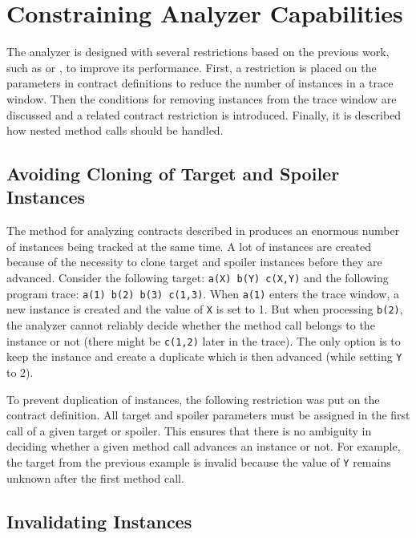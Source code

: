 \section{Constraining Analyzer Capabilities}
\label{constraining}

The analyzer is designed with several restrictions based on the previous work,
such as \cite{janousek} or \cite{FITPUB10817}, to improve its performance.
First, a restriction is placed on the parameters in contract definitions to
reduce the number of instances in a trace window. Then the conditions for
removing instances from the trace window are discussed and a related contract
restriction is introduced. Finally, it is described how nested method calls
should be handled.

\subsection{Avoiding Cloning of Target and Spoiler Instances}

The method for analyzing contracts described in \cite{janousek} produces an
enormous number of instances being tracked at the same time. A lot of instances
are created because of the necessity to clone target and spoiler instances
before they are advanced. Consider the following target: \texttt{a(X) b(Y)
c(X,Y)} and the following program trace: \texttt{a(1) b(2) b(3) c(1,3)}.  When
\texttt{a(1)} enters the trace window, a new instance is created and the value
of \texttt{X} is set to 1. But when processing \texttt{b(2)}, the analyzer
cannot reliably decide whether the method call belongs to the instance or not
(there might be \texttt{c(1,2)} later in the trace). The only option is to keep
the instance and create a duplicate which is then advanced (while setting
\texttt{Y} to 2).

To prevent duplication of instances, the following restriction was put on the
contract definition. All target and spoiler parameters must be assigned in the
first call of a given target or spoiler. This ensures that there is no ambiguity
in deciding whether a given method call advances an instance or not. For
example, the target from the previous example is invalid because the value of
\texttt{Y} remains unknown after the first method call.

\subsection{Invalidating Instances}

